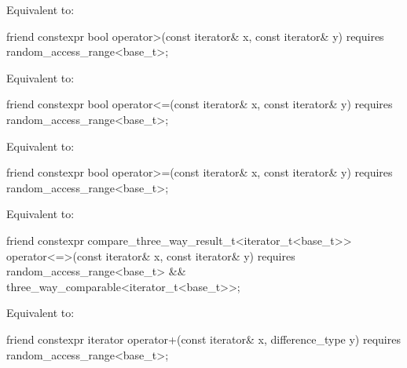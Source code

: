 \begin{itemdescr}
\pnum
\effects
Equivalent to: 
\end{itemdescr}

%
\begin{itemdecl}
friend constexpr bool operator>(const iterator& x, const iterator& y)
  requires random_access_range<base_t>;
\end{itemdecl}

\begin{itemdescr}
\pnum
\effects
Equivalent to: 
\end{itemdescr}

%
\begin{itemdecl}
friend constexpr bool operator<=(const iterator& x, const iterator& y)
  requires random_access_range<base_t>;
\end{itemdecl}

\begin{itemdescr}
\pnum
\effects
Equivalent to: 
\end{itemdescr}

%
\begin{itemdecl}
friend constexpr bool operator>=(const iterator& x, const iterator& y)
  requires random_access_range<base_t>;
\end{itemdecl}

\begin{itemdescr}
\pnum
\effects
Equivalent to: 
\end{itemdescr}

%
\begin{itemdecl}
friend constexpr compare_three_way_result_t<iterator_t<base_t>>
  operator<=>(const iterator& x, const iterator& y)
    requires random_access_range<base_t> && three_way_comparable<iterator_t<base_t>>;
\end{itemdecl}

\begin{itemdescr}
\pnum
\effects
Equivalent to: 
\end{itemdescr}

%
\begin{itemdecl}
friend constexpr iterator operator+(const iterator& x, difference_type y)
  requires random_access_range<base_t>;
\end{itemdecl}

